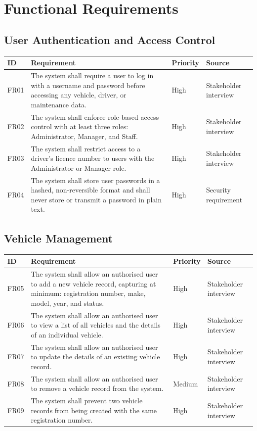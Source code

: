 \documentclass[11pt,a4paper]{article}
\begin{document}
\section{Functional Requirements}

\subsection{User Authentication and Access Control}
\begin{longtable}{@{}p{1.3cm}p{9.2cm}p{1.6cm}p{2.4cm}@{}}
\toprule
ID & Requirement & Priority & Source \\
\midrule
\endhead
FR01 & The system shall require a user to log in with a username and
password before accessing any vehicle, driver, or maintenance data. &
High & Stakeholder interview \\
FR02 & The system shall enforce role-based access control with at least
three roles: Administrator, Manager, and Staff. & High & Stakeholder
interview \\
FR03 & The system shall restrict access to a driver's licence number to
users with the Administrator or Manager role. & High & Stakeholder
interview \\
FR04 & The system shall store user passwords in a hashed, non-reversible
format and shall never store or transmit a password in plain text. &
High & Security requirement \\
\bottomrule
\end{longtable}

\subsection{Vehicle Management}
\begin{longtable}{@{}p{1.3cm}p{9.2cm}p{1.6cm}p{2.4cm}@{}}
\toprule
ID & Requirement & Priority & Source \\
\midrule
\endhead
FR05 & The system shall allow an authorised user to add a new vehicle
record, capturing at minimum: registration number, make, model, year,
and status. & High & Stakeholder interview \\
FR06 & The system shall allow an authorised user to view a list of all
vehicles and the details of an individual vehicle. & High & Stakeholder
interview \\
FR07 & The system shall allow an authorised user to update the details of
an existing vehicle record. & High & Stakeholder interview \\
FR08 & The system shall allow an authorised user to remove a vehicle
record from the system. & Medium & Stakeholder interview \\
FR09 & The system shall prevent two vehicle records from being created
with the same registration number. & High & Stakeholder interview \\
\bottomrule
\end{longtable}
\end{document}

